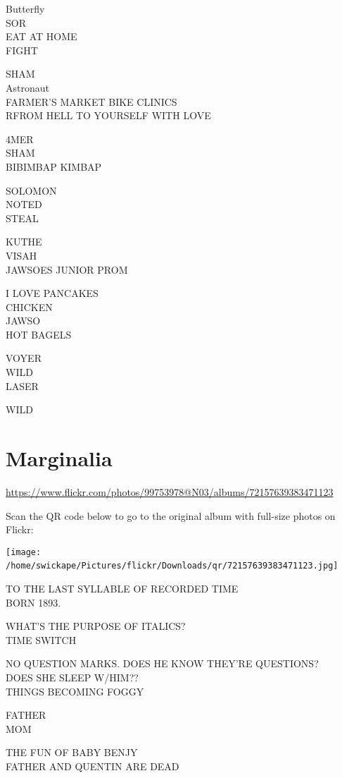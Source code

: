 \documentclass[10pt,letterpaper]{article}
\begin{document}
Butterfly\\
SOR\\
EAT AT HOME\\
FIGHT

SHAM\\
Astronaut\\
FARMER'S MARKET BIKE CLINICS\\
RFROM HELL TO YOURSELF WITH LOVE

4MER\\
SHAM\\
BIBIMBAP KIMBAP

SOLOMON\\
NOTED\\
STEAL

KUTHE\\
VISAH\\
JAWSOES JUNIOR PROM

I LOVE PANCAKES\\
CHICKEN\\
JAWSO\\
HOT BAGELS

VOYER\\
WILD\\
LASER

WILD
\

\section*{Marginalia}

\url{https://www.flickr.com/photos/99753978@N03/albums/72157639383471123}

Scan the QR code below to go to the original album with full-size photos on Flickr:

\texttt{[image: /home/swickape/Pictures/flickr/Downloads/qr/72157639383471123.jpg]}
\

TO THE LAST SYLLABLE OF RECORDED TIME\\
BORN 1893.

WHAT'S THE PURPOSE OF ITALICS?\\
TIME SWITCH

NO QUESTION MARKS.  DOES HE KNOW THEY'RE QUESTIONS?\\
DOES SHE SLEEP W/HIM??\\
THINGS BECOMING FOGGY

FATHER\\
MOM

THE FUN OF BABY BENJY\\
FATHER AND QUENTIN ARE DEAD
\end{document}

